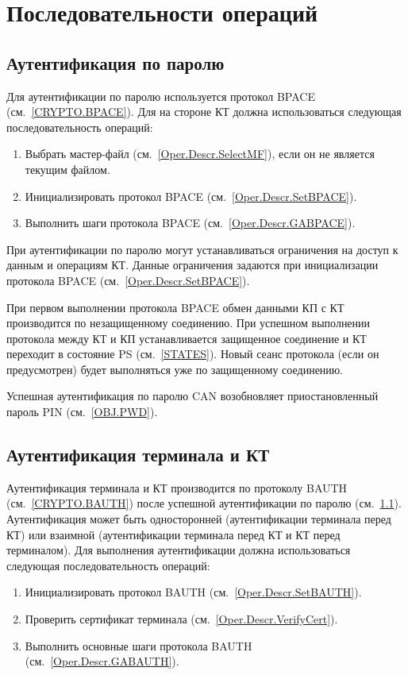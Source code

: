 \section{Последовательности операций}
\label{Oper.Seq}

\subsection{Аутентификация по паролю}
\label{Oper.Seq.BPACE}

Для аутентификации по паролю используется протокол BPACE (см.~\ref{CRYPTO.BPACE}). 
Для  на стороне КТ должна 
использоваться следующая последовательность операций:

\begin{enumerate}
\item Выбрать мастер-файл (см.~\ref{Oper.Descr.SelectMF}), 
если он не является текущим  файлом.

\item Инициализировать протокол BPACE (см.~\ref{Oper.Descr.SetBPACE}).

\item Выполнить шаги протокола BPACE (см.~\ref{Oper.Descr.GABPACE}).
\end{enumerate}

При аутентификации по паролю могут устанавливаться ограничения 
на доступ к данным и операциям КТ.
Данные ограничения задаются при инициализации 
протокола BPACE (см.~\ref{Oper.Descr.SetBPACE}).

При первом выполнении протокола BPACE обмен данными КП с КТ производится 
по незащищенному соединению. При успешном выполнении протокола между КТ и 
КП устанавливается защищенное соединение и КТ переходит в состояние PS
(см.~\ref{STATES}). Новый сеанс протокола (если он 
предусмотрен) будет выполняться уже по защищенному соединению. 

Успешная аутентификация по паролю CAN возобновляет приостановленный 
пароль PIN (см.~\ref{OBJ.PWD}).

\subsection{Аутентификация терминала и КТ}
\label{Oper.Seq.BAUTH}

Аутентификация терминала и КТ производится по протоколу BAUTH 
(см.~\ref{CRYPTO.BAUTH}) после успешной аутентификации по паролю 
(см.~\ref{Oper.Seq.BPACE}). Аутентификация может быть односторонней 
(аутентификации терминала перед КТ) или взаимной (аутентификации терминала 
перед КТ и КТ перед терминалом). Для выполнения аутентификации должна 
использоваться следующая последовательность операций:
%
\begin{enumerate}
\item Инициализировать протокол BAUTH (см.~\ref{Oper.Descr.SetBAUTH}).
\item Проверить сертификат терминала (см.~\ref{Oper.Descr.VerifyCert}).
\item Выполнить основные шаги протокола BAUTH (см.~\ref{Oper.Descr.GABAUTH}).
\end{enumerate}


